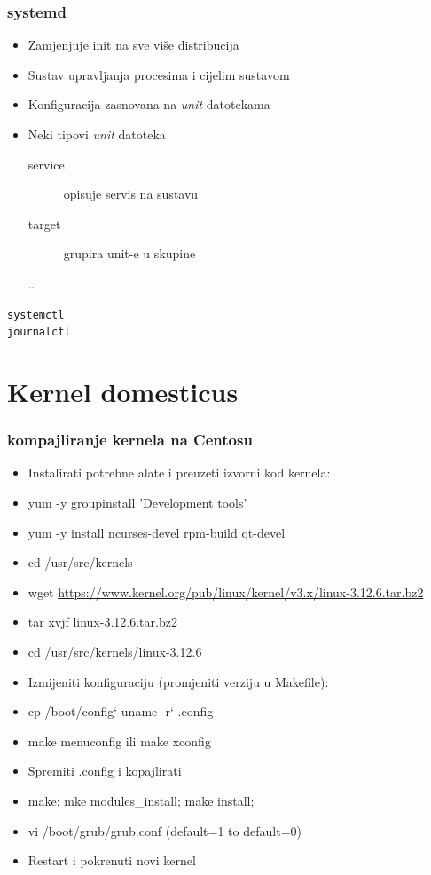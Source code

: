 \documentclass[t]{beamer}
\begin{document}
\begin{frame}
	\frametitle{systemd}
	\begin{itemize}
		\item Zamjenjuje init na sve više distribucija
		\item Sustav upravljanja procesima i cijelim sustavom
	\end{itemize}
	\begin{itemize}
		\item Konfiguracija zasnovana na \emph{unit} datotekama
		\item Neki tipovi \emph{unit} datoteka
		\begin{description}
			\item[service] opisuje servis na sustavu
			\item[target] grupira unit-e u skupine
			\item[\dots]
		\end{description}
	\end{itemize}
	\vfill
	\texttt{systemctl} \\ \texttt{journalctl}
\end{frame}

\section{Kernel domesticus}
\frametitle{kompajliranje kernela na Centosu}
\begin{frame}
    \begin{itemize}
    \item Instalirati potrebne alate i preuzeti izvorni kod kernela:
    \item yum -y groupinstall 'Development tools'
    \item yum -y install ncurses-devel rpm-build qt-devel
    \item cd /usr/src/kernels
    \item wget \url{https://www.kernel.org/pub/linux/kernel/v3.x/linux-3.12.6.tar.bz2}
    \item tar xvjf linux-3.12.6.tar.bz2
    \item cd /usr/src/kernels/linux-3.12.6
    \item Izmijeniti konfiguraciju (promjeniti verziju u Makefile):
    \item cp /boot/config`-uname -r` .config
    \item make menuconfig ili make xconfig
    \item Spremiti .config i kopajlirati
    \item make; mke modules\_install; make install;
    \item vi /boot/grub/grub.conf (default=1 to default=0)
    \item Restart i pokrenuti novi kernel
	\end{itemize}
\end{frame}
\end{document}

